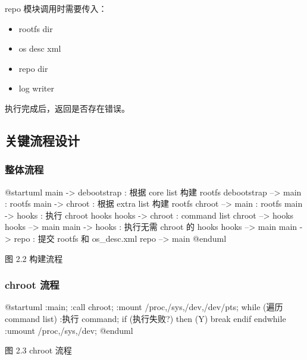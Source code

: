 \documentclass{utart}
\begin{document}
repo 模块调用时需要传入：
\begin{itemize}[leftmargin=4em]
\item rootfs dir
\item os desc xml
\item repo dir
\item log writer
\end{itemize}

执行完成后，返回是否存在错误。

\subsection{关键流程设计}
\subsubsection{整体流程}
\begin{center}
  \begin{adjustbox}{scale=1.0}
    \begin{plantuml}
      @startuml
      main -> debootstrap : 根据 core list 构建 rootfs
      debootstrap --> main : rootfs
      main -> chroot : 根据 extra list 构建 rootfs
      chroot --> main : rootfs
      main -> hooks : 执行 chroot hooks
      hooks -> chroot : command list
      chroot --> hooks
      hooks --> main
      main -> hooks : 执行无需 chroot 的 hooks
      hooks --> main
      main -> repo : 提交 rootfs 和 os_desc.xml
      repo --> main
      @enduml
    \end{plantuml}
  \end{adjustbox}

  图 2.2 构建流程
\end{center}

\subsubsection{chroot 流程}
\begin{center}
  \begin{adjustbox}{scale=1.0}
    \begin{plantuml}
      @startuml
      :main;
      :call chroot;
      :mount /proc,/sys,/dev,/dev/pts;
      while (遍历 command list)
      :执行 command;
      if (执行失败?) then (Y)
      break
      endif
      endwhile
      :umount /proc,/sys,/dev;
      @enduml
    \end{plantuml}
  \end{adjustbox}

  图 2.3 chroot 流程
\end{center}
\end{document}

